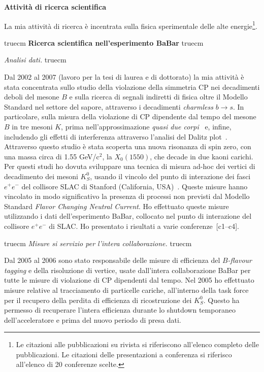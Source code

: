\documentclass[11pt,twoside,a4paper]{article}
\begin{document}
\begin{center}
{\bf{Attivit\`a di ricerca scientifica}}
\end{center}

La mia attivit\`a di ricerca \`e incentrata sulla fisica sperimentale
delle alte energie\footnote{Le citazioni alle pubblicazioni su rivista
si riferiscono all'elenco completo delle pubblicazioni. Le citazioni
delle presentazioni a conferenza si riferisco all'elenco di 20
conferenze scelte.}.


 truecm
{\bf{Ricerca scientifica nell'esperimento BaBar}}
 truecm

\textit{Analisi dati.}
 truecm

Dal 2002 al 2007 (lavoro per la tesi di laurea e di dottorato) la mia
attivit\`a \`e stata concentrata sullo studio della violazione della
simmetria CP nei decadimenti deboli del mesone $B$ e sulla ricerca di
segnali indiretti di fisica oltre il Modello Standard nel settore del
sapore, attraverso i decadimenti \textit{charmless} $b \to s$. In
particolare, sulla misura della violazione di CP dipendente dal tempo
del mesone $B$ in tre mesoni $K$, prima nell'approssimazione
\textit{quasi due corpi}~\cite{Aubert:2008rr} e, infine, includendo
gli effetti di interferenza attraverso l'analisi del Dalitz
plot~\cite{Aubert:2007sd,Aubert:2007me}. Attraverso questo studio \`e
stata scoperta una nuova risonanza di spin zero, con una massa circa
di 1.55 GeV/c$^2$, la $X_0(1550)$, che decade in due kaoni
carichi. Per questi studi ho dovuta sviluppare una tecnica di misura
ad-hoc dei vertici di decadimento dei mesoni $K^0_S$, usando il
vincolo del punto di interazione dei fasci $e^+e^-$ del collisore SLAC
di Stanford (California, USA)~\cite{Aubert:2005dy,Aubert:2005gj}.
Queste misure hanno vincolato in modo significativo la presenza di
processi non previsti dal Modello Standard \textit{Flavor Changing
  Neutral Current}.  Ho effettuato queste misure utilizzando i dati
dell'esperimento BaBar, collocato nel punto di interazione del
collisore $e^+e^-$ di SLAC. Ho presentato i risultati a varie
conferenze~[c1--c4].

 truecm
\textit{Misure si servizio per l'intera collaborazione.}
 truecm

Dal 2005 al 2006 sono stato responsabile delle misure di efficienza
del \textit{$B$-flavour tagging} e della risoluzione di vertice, usate
dall'intera collaborazione BaBar per tutte le misure di violazione di
CP dipendenti dal tempo. Nel 2005 ho effettuato misure relative al
tracciamento di particelle cariche, all'interno della task force per
il recupero della perdita di efficienza di ricostruzione dei
$K^0_S$. Questo ha permesso di recuperare l'intera efficienza durante
lo shutdown temporaneo dell'acceleratore e prima del nuovo periodo di
presa dati.
\end{document}
